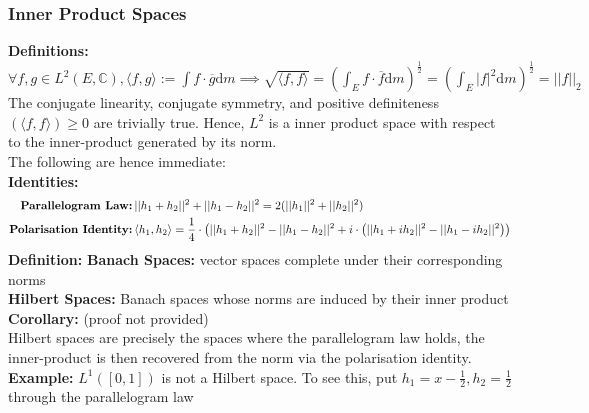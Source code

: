 \documentclass{article}
\newcommand{\C}{\mathbb{C}}
\newcommand{\0}{{\bf{0}}}
\newcommand{\1}{{\bf{1}}}
\newcommand{\dint}{\displaystyle\int}
\newcommand{\dif}{\mbox{d}}
\begin{document}
\subsubsection{Inner Product Spaces}
\textbf{Definitions:} $\forall f,g\in L^2(E,\C),\langle f,g\rangle:=\dint f\cdot\overline{g}\dif m\implies\sqrt{\langle f,f\rangle}=(\dint_Ef\cdot\overline{f}\dif m)^\frac{1}{2}=(\dint_E|f|^2\dif m)^\frac{1}{2}=||f||_2$\\
The conjugate linearity, conjugate symmetry, and positive definiteness $(\langle f,f\rangle)\geq0$ are trivially true. Hence, $L^2$ is a inner product space with respect to the inner-product generated by its norm.\\
The following are hence immediate:\\
\textbf{Identities:}\\
\begin{equation}
\begin{split}
    \mbox{\textbf{Parallelogram Law:}}\,&||h_1+h_2||^2+||h_1-h_2||^2=2(||h_1||^2+||h_2||^2)\\
    \mbox{\textbf{Polarisation Identity:}}\,&\langle h_1,h_2\rangle=\frac{1}{4}\cdot\left(||h_1+h_2||^2-||h_1-h_2||^2+i\cdot\left(||h_1+ih_2||^2-||h_1-ih_2||^2\right)\right)
\end{split}
\end{equation}
\textbf{Definition:}
\quad\textbf{Banach Spaces:} vector spaces complete under their corresponding norms\\
\quad\textbf{Hilbert Spaces:} Banach spaces whose norms are induced by their inner product\\
\textbf{Corollary:} (proof not provided)\\
Hilbert spaces are precisely the spaces where the parallelogram law holds, the inner-product is then recovered from the norm via the polarisation identity.\\
\textbf{Example:} $L^1([0,1])$ is not a Hilbert space. To see this, put $h_1=x-\frac{1}{2},h_2=\frac{1}{2}$ through the parallelogram law\\
\end{document}
